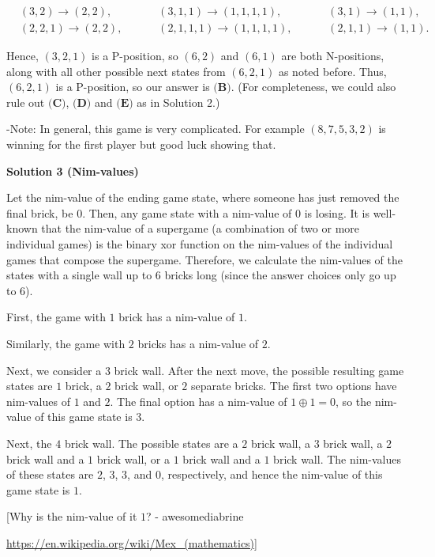 \begin{enumerate}
 
 \begin{align*} &(3, 2) \to (2, 2), && &&(3, 1, 1) \to (1, 1, 1, 1), && &&(3, 1) \to (1, 1), \\ &(2, 2, 1) \to (2, 2), && &&(2, 1, 1, 1) \to (1, 1, 1, 1), && &&(2, 1, 1) \to (1, 1). \end{align*}


 Hence, $(3, 2, 1)$ is a P-position, so $(6, 2)$ and $(6, 1)$ are both N-positions, along with all other possible next states from $(6, 2, 1)$ as noted before. Thus, $(6, 2, 1)$ is a P-position, so our answer is $\boxed{\textbf{(B)}}$. (For completeness, we could also rule out $\textbf{(C)}$, $\textbf{(D)}$ and $\textbf{(E)}$ as in Solution 2.)

 -Note: In general, this game is very complicated. For example $(8, 7, 5, 3, 2)$ is winning for the first player but good luck showing that.

 



\textbf{Solution 3 (Nim-values)}

Let the nim-value of the ending game state, where someone has just removed the final brick, be $0$. Then, any game state with a nim-value of $0$ is losing. It is well-known that the nim-value of a supergame (a combination of two or more individual games) is the binary xor function on the nim-values of the individual games that compose the supergame. Therefore, we calculate the nim-values of the states with a single wall up to $6$ bricks long (since the answer choices only go up to $6$). 

 First, the game with $1$ brick has a nim-value of $1$. 

 Similarly, the game with $2$ bricks has a nim-value of $2$.

 Next, we consider a $3$ brick wall. After the next move, the possible resulting game states are $1$ brick, a $2$ brick wall, or $2$ separate bricks. The first two options have nim-values of $1$ and $2$. The final option has a nim-value of $1\oplus 1 = 0$, so the nim-value of this game state is $3$. 

 Next, the $4$ brick wall. The possible states are a $2$ brick wall, a $3$ brick wall, a $2$ brick wall and a $1$ brick wall, or a $1$ brick wall and a $1$ brick wall. The nim-values of these states are $2$, $3$, $3$, and $0$, respectively, and hence the nim-value of this game state is $1$.

 [Why is the nim-value of it $1$? - awesomediabrine

 \href{https://en.wikipedia.org/wiki/Mex\_(mathematics)}{https://en.wikipedia.org/wiki/Mex\_(mathematics)}]


\end{enumerate}
